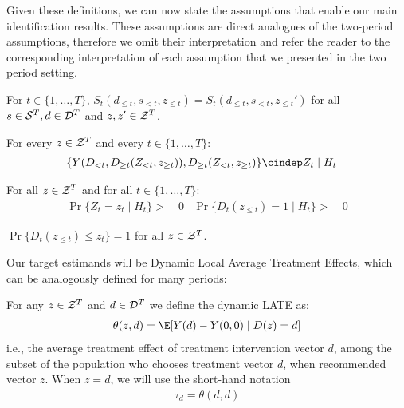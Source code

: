 Given these definitions, we can now state the assumptions that enable our main identification results. These assumptions are direct analogues of the two-period assumptions, therefore we omit their interpretation and refer the reader to the corresponding interpretation of each assumption that we presented in the two period setting.
\begin{assumption}
[Exclusion]\label{assume:2_exclusion_many}
For $t\in \{1,\ldots, T\}$,  $S_{t}(d_{\leq t}, s_{<t}, z_{\leq t})=S_{t}(d_{\leq t}, s_{<t}, z_{\leq t}')$
for all $s\in {\cal S}^T,d\in {\cal D}^T$ and $z,z'\in {\cal Z}^T$.
\end{assumption}

\begin{assumption}\label{assume:2_ignorability_many}
For every $z\in {\cal Z}^T$ and every $t \in \{1,\ldots, T\}$:
\begin{align*}
    \{Y(D_{< t}, D_{\geq t}(Z_{<t}, z_{\geq t})), D_{\geq t}(Z_{<t}, z_{\geq t})\} \cindep& Z_t \mid H_t
\end{align*}
\end{assumption}

\begin{assumption}\label{assume:2_overlap_many}
For all $z\in {\cal Z}^T$ and for all $t\in \{1,\ldots, T\}$:
\begin{align*}
\Pr\{Z_t=z_t \mid H_t\} >~& 0 &
\Pr\{D_t(z_{\leq t}) = 1 \mid H_t\} >~& 0
\end{align*}
\end{assumption}

\begin{assumption}\label{assume:2_one_sided_many}
$\Pr\{D_t(z_{\leq t}) \leq z_t\}=1$ for all $z\in {\cal Z}^T$.
\end{assumption}

Our target estimands will be Dynamic Local Average Treatment Effects, which can be analogously defined for many periods:
\begin{definition}\label{def:dyn_late_many} For any $z\in {\cal Z}^T$ and $d\in {\cal D}^T$ we define the dynamic LATE as:
\begin{align}
    \theta(z,d) = \E[Y(d) - Y(0,0)\mid D(z)=d]
\end{align}
i.e., the average treatment effect of treatment intervention vector $d$, among the subset of the population who chooses treatment vector $d$, when recommended vector $z$. When $z=d$, we will use the short-hand notation 
\begin{align}
    \tau_d = \theta(d,d)
\end{align}
\end{definition}

